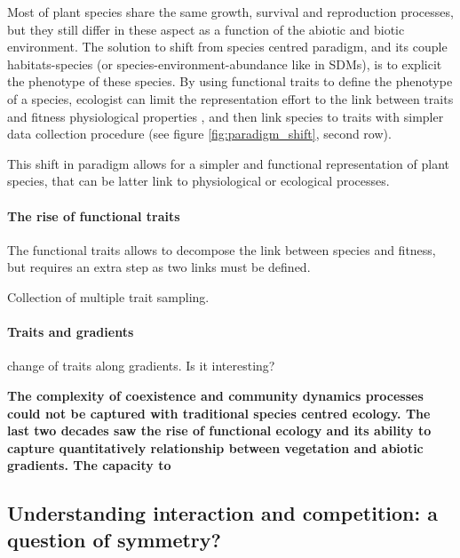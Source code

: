Most of plant species share the same growth, survival and reproduction processes, but they still differ in these aspect as a function of the abiotic and biotic environment. The solution to shift from species centred paradigm, and its couple habitats-species (or species-environment-abundance like in SDMs), is to explicit the phenotype of these species. By using functional traits to define the phenotype of a species, ecologist can limit the representation effort to the link between traits and fitness physiological properties \parencite{reich_leaf_1992}, and then link species to traits with simpler data collection procedure \parencite{cornelissen_handbook_2003} (see figure \ref{fig:paradigm_shift}, second row).


This shift in paradigm allows for a simpler and functional representation of plant species, that can be latter link to physiological or ecological processes.




\paragraph{The rise of functional traits}

The functional traits allows to decompose the link between species and fitness, but requires an extra step as two links must be defined. 

Collection of multiple trait sampling.

\paragraph{Traits and gradients}


change of traits along gradients. Is it interesting?



\textbf{The complexity of coexistence and community dynamics processes could not be captured with traditional species centred ecology. The last two decades saw the rise of functional ecology and its ability to capture quantitatively relationship between vegetation and abiotic gradients. The capacity to }

\subsection{Understanding interaction and competition: a question of symmetry?}

